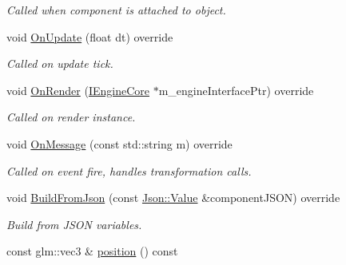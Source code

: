 \begin{DoxyCompactItemize}
\begin{DoxyCompactList}\small\item\em Called when component is attached to object. \end{DoxyCompactList}\item 
\hypertarget{class_transform_component_ab763f5af77fcb5eee0e725c219901fa3}{void \hyperlink{class_transform_component_ab763f5af77fcb5eee0e725c219901fa3}{On\+Update} (float dt) override}\label{class_transform_component_ab763f5af77fcb5eee0e725c219901fa3}

\begin{DoxyCompactList}\small\item\em Called on update tick. \end{DoxyCompactList}\item 
\hypertarget{class_transform_component_aaadf29ab1be89d21ac13b3e7e5030be8}{void \hyperlink{class_transform_component_aaadf29ab1be89d21ac13b3e7e5030be8}{On\+Render} (\hyperlink{class_i_engine_core}{I\+Engine\+Core} $\ast$m\+\_\+engine\+Interface\+Ptr) override}\label{class_transform_component_aaadf29ab1be89d21ac13b3e7e5030be8}

\begin{DoxyCompactList}\small\item\em Called on render instance. \end{DoxyCompactList}\item 
\hypertarget{class_transform_component_ac250c4b7e47e639d0f8693d04c9b5051}{void \hyperlink{class_transform_component_ac250c4b7e47e639d0f8693d04c9b5051}{On\+Message} (const std\+::string m) override}\label{class_transform_component_ac250c4b7e47e639d0f8693d04c9b5051}

\begin{DoxyCompactList}\small\item\em Called on event fire, handles transformation calls. \end{DoxyCompactList}\item 
\hypertarget{class_transform_component_a4b1799af3b52257841775966452f231b}{void \hyperlink{class_transform_component_a4b1799af3b52257841775966452f231b}{Build\+From\+Json} (const \hyperlink{class_json_1_1_value}{Json\+::\+Value} \&component\+J\+S\+O\+N) override}\label{class_transform_component_a4b1799af3b52257841775966452f231b}

\begin{DoxyCompactList}\small\item\em Build from J\+S\+O\+N variables. \end{DoxyCompactList}\item 
\hypertarget{class_transform_component_a720f52d1a6425e336304ea15b2e45e21}{const glm\+::vec3 \& \hyperlink{class_transform_component_a720f52d1a6425e336304ea15b2e45e21}{position} () const }\label{class_transform_component_a720f52d1a6425e336304ea15b2e45e21}


\end{DoxyCompactItemize}
